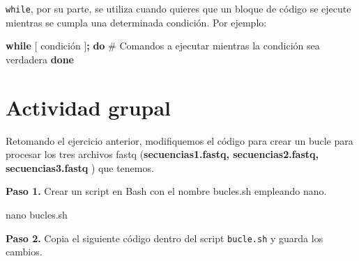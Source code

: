 \documentclass[
  spanish,
  12pt,
  letterpaper,
  DIV=11,
  numbers=noendperiod]{scrreprt}
\newenvironment{Shaded}{\begin{snugshade}}{\end{snugshade}}
\newcommand{\BuiltInTok}[1]{\textcolor[rgb]{0.00,0.23,0.31}{#1}}
\newcommand{\CommentTok}[1]{\textcolor[rgb]{0.37,0.37,0.37}{#1}}
\newcommand{\ControlFlowTok}[1]{\textcolor[rgb]{0.00,0.23,0.31}{\textbf{#1}}}
\newcommand{\FunctionTok}[1]{\textcolor[rgb]{0.28,0.35,0.67}{#1}}
\newcommand{\KeywordTok}[1]{\textcolor[rgb]{0.00,0.23,0.31}{\textbf{#1}}}
\newcommand{\NormalTok}[1]{\textcolor[rgb]{0.00,0.23,0.31}{#1}}
\begin{document}
\begin{tcolorbox}[enhanced jigsaw, arc=.35mm, bottomrule=.15mm, bottomtitle=1mm, breakable, colback=white, colbacktitle=quarto-callout-note-color!10!white, colframe=quarto-callout-note-color-frame, coltitle=black, left=2mm, leftrule=.75mm, opacityback=0, opacitybacktitle=0.6, rightrule=.15mm, title={while}, titlerule=0mm, toprule=.15mm, toptitle=1mm]

\texttt{while}, por su parte, se utiliza cuando quieres que un bloque de
código se ejecute mientras se cumpla una determinada condición. Por
ejemplo:

\end{tcolorbox}

\begin{Shaded}
\begin{Highlighting}[]
\ControlFlowTok{while} \BuiltInTok{[}\NormalTok{ condición }\BuiltInTok{]}\KeywordTok{;} \ControlFlowTok{do}
  \CommentTok{\# Comandos a ejecutar mientras la condición sea verdadera}
\ControlFlowTok{done}
\end{Highlighting}
\end{Shaded}

\section{Actividad grupal}\label{actividad-grupal}

Retomando el ejercicio anterior, modifiquemos el código para crear un
bucle para procesar los tres archivos fastq (\textbf{secuencias1.fastq,
secuencias2.fastq, secuencias3.fastq} ) que tenemos.

\textbf{Paso 1.} Crear un script en Bash con el nombre bucles.sh
empleando nano.

\begin{Shaded}
\begin{Highlighting}[]
\FunctionTok{nano}\NormalTok{ bucles.sh}
\end{Highlighting}
\end{Shaded}

\textbf{Paso 2.} Copia el siguiente código dentro del script
\texttt{bucle.sh} y guarda los cambios.
\end{document}
